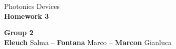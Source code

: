 \documentclass[english, 11pt]{article}
\begin{document}
	\begin{center}
		\Large Photonics Devices\\
		\huge \textbf{Homework 3}\\[3mm]
		\begin{framed}
			\Large \textbf{Group 2} \\[2mm]
			\normalsize \textbf{Eleuch} Salma --  \textbf{Fontana} Marco -- \textbf{Marcon} Gianluca
		\end{framed}
	\end{center}	
	\FloatBarrier
	
	
	
	
	
	
	
	
		
\end{document}
